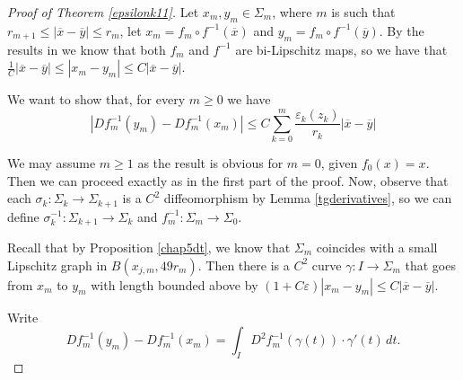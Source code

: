 \documentclass[11pt, twoside, leqno]{article}
\numberwithin{equation}{section}
\theoremstyle{plain}
\theoremstyle{definition}
\newcommand{\e}{\varepsilon} %
\begin{document}
\begin{proof}[Proof of Theorem \ref{epsilonk11}]
Let $x_m,y_m \in \Sigma_m$, where $m$ is such that $r_{m+1}\leq |\overline{x}-\overline{y}| \leq r_m$,  let $x_m = f_m\circ f^{-1}(\overline{x})$ and $y_m = f_m\circ f^{-1}(\overline{y})$. %
By the results in \cite{davidtoro} we know that both $f_m$ and $f^{-1}$ are bi-Lipschitz maps, so we have that $\frac{1}{C} |\overline{x}-\overline{y}| \leq |x_m-y_m| \leq C |\overline{x}-\overline{y}|$.

We want to show that, for every $m \geq 0$ we have
\begin{equation}
\left|Df_m^{-1}(y_m)-Df_m^{-1}(x_m)\right| \leq  C\sum_{k=0}^m  \frac{\e_k(z_k)}{r_k}|\overline{x}-\overline{y}|
\end{equation}

We may assume $m \geq 1$ as the result is obvious for $m=0$, given $f_0(x)=x$. 
Then we can proceed exactly as in the first part of the proof.
Now, observe that each $\sigma_k \colon \Sigma_k \to \Sigma_{k+1}$ is a $C^2$ diffeomorphism by Lemma \ref{tgderivatives}, so we can define $\sigma_k^{-1} \colon \Sigma_{k+1} \to \Sigma_k$ and $f_m^{-1} \colon \Sigma_m \to \Sigma_0$. 


Recall that by Proposition \ref{chap5dt}, we know that $\Sigma_m$ coincides with a small Lipschitz graph in $B(x_{j,m},49r_m)$. Then there is a $C^2$ curve $\gamma \colon I \to \Sigma_m$ that goes from $x_m$ to $y_m$ with length bounded above by $(1 + C \e) |x_m-y_m|\leq C |\overline{x}-\overline{y}|$.

Write
\begin{equation}
Df^{-1}_m(y_m)-Df^{-1}_m(x_m)= \int_I D^2f_m^{-1} ( \gamma (t))\cdot \gamma'(t)\,dt.
\end{equation}



\end{proof}
\end{document}
